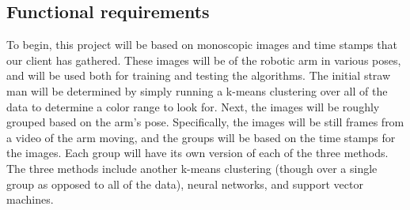\documentclass[10pt,journal,compsoc, draftclsnofoot,onecolumn]{IEEEtran}
\begin{document}
\subsection{Functional requirements}

To begin, this project will be based on monoscopic images and time stamps that our client has gathered.
These images will be of the robotic arm in various poses, and will be used both for training and testing the algorithms.
The initial straw man will be determined by simply running a k-means clustering over all of the data to determine a color range to look for.
Next, the images will be roughly grouped based on the arm's pose.
Specifically, the images will be still frames from a video of the arm moving, and the groups will be based on the time stamps for the images.
Each group will have its own version of each of the three methods.
The three methods include another k-means clustering (though over a single group as opposed to all of the data), neural networks, and support vector machines.
\end{document}

